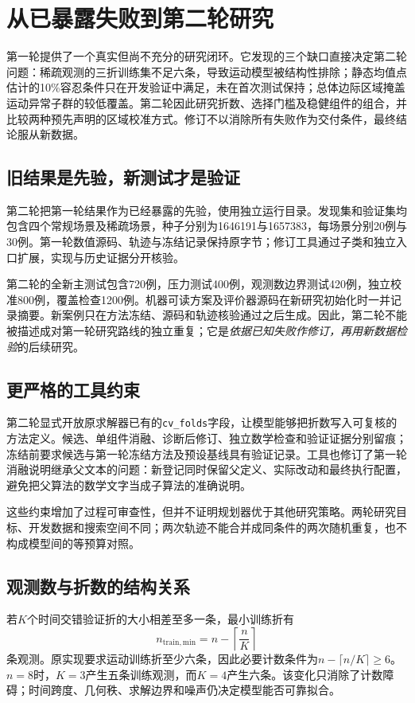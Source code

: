 \section{从已暴露失败到第二轮研究}
\label{sec:revision-design}

第一轮提供了一个真实但尚不充分的研究闭环。它发现的三个缺口直接决定第二轮问题：稀疏观测的三折训练集不足六条，导致运动模型被结构性排除；静态均值点估计的10\%容忍条件只在开发验证中满足，未在首次测试保持；总体边际区域掩盖运动异常子群的较低覆盖。第二轮因此研究折数、选择门槛及稳健组件的组合，并比较两种预先声明的区域校准方式。修订不以消除所有失败作为交付条件，最终结论服从新数据。

\subsection{旧结果是先验，新测试才是验证}
第二轮把第一轮结果作为已经暴露的先验，使用独立运行目录。发现集和验证集均包含四个常规场景及稀疏场景，种子分别为1646191与1657383，每场景分别20例与30例。第一轮数值源码、轨迹与冻结记录保持原字节；修订工具通过子类和独立入口扩展，实现与历史证据分开核验。

第二轮的全新主测试包含720例，压力测试400例，观测数边界测试420例，独立校准800例，覆盖检查1200例。机器可读方案及评价器源码在新研究初始化时一并记录摘要。新案例只在方法冻结、源码和轨迹核验通过之后生成。因此，第二轮不能被描述成对第一轮研究路线的独立重复；它是\emph{依据已知失败作修订，再用新数据检验}的后续研究。

\subsection{更严格的工具约束}
第二轮显式开放原求解器已有的\texttt{cv\_folds}字段，让模型能够把折数写入可复核的方法定义。候选、单组件消融、诊断后修订、独立数学检查和验证证据分别留痕；冻结前要求候选与第一轮冻结方法及预设基线具有验证记录。工具也修订了第一轮消融说明继承父文本的问题：新登记同时保留父定义、实际改动和最终执行配置，避免把父算法的数学文字当成子算法的准确说明。

这些约束增加了过程可审查性，但并不证明规划器优于其他研究策略。两轮研究目标、开发数据和搜索空间不同；两次轨迹不能合并成同条件的两次随机重复，也不构成模型间的等预算对照。

\subsection{观测数与折数的结构关系}
若$K$个时间交错验证折的大小相差至多一条，最小训练折有
\[
 n_{\mathrm{train,min}}=n-\left\lceil\frac{n}{K}\right\rceil
\]
条观测。原实现要求运动训练折至少六条，因此必要计数条件为$n-\lceil n/K\rceil\ge6$。$n=8$时，$K=3$产生五条训练观测，而$K=4$产生六条。该变化只消除了计数障碍；时间跨度、几何秩、求解边界和噪声仍决定模型能否可靠拟合。

